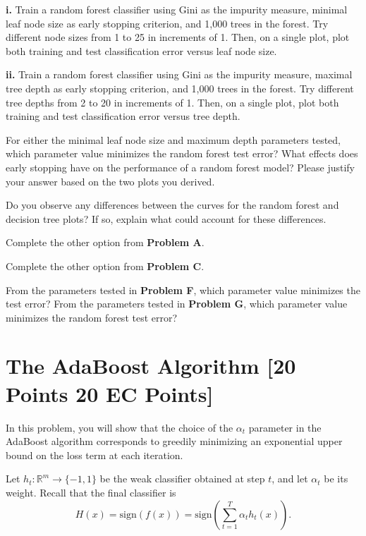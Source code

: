 \textbf{i.} Train a random forest classifier using Gini as the impurity measure, minimal leaf node size as early stopping criterion, and 1,000 trees in the forest. Try different node sizes from 1 to 25 in increments of 1. Then, on a single plot, plot both training and test classification error versus
leaf node size.

\textbf{ii.} Train a random forest classifier using Gini as the impurity measure, maximal tree depth as early stopping criterion, and 1,000 trees in the forest. Try different tree depths from 2 to 20 in increments of 1. Then, on a single plot, plot both training and test classification error versus tree depth.

\problem[3]
For either the minimal leaf node size and maximum depth parameters tested, which parameter value minimizes the random forest test error? What effects does early stopping have on the performance of a random forest model?
Please justify your answer based on the two plots you derived.


\problem[5]
Do you observe any differences between the curves for the random forest and decision tree plots? If so, explain what could account for these differences.


\problem[7 EC]
Complete the other option from \textbf{Problem A}.

\problem[2 EC]
Complete the other option from \textbf{Problem C}.

\problem[1 EC]
From the parameters tested in \textbf{Problem F}, which parameter value minimizes the test error? From the parameters tested in \textbf{Problem G}, which parameter value minimizes the random forest test error? 



\newpage
\section{The AdaBoost Algorithm [20 Points 20 EC Points]}

In this problem, you will show that the choice of the $\alpha_t$ parameter in
the AdaBoost algorithm corresponds to greedily minimizing an exponential upper
bound on the loss term at each iteration.

\problem[3 EC]
Let $h_t: \mathbb{R}^m \rightarrow \{-1,1\}$ be the weak classifier obtained at step $t$, and let $\alpha_t$ be
its weight. Recall that the final classifier is $$H(x) = \text{sign}(f(x)) = \text{sign} \left(\sum\limits_{t=1}^T \alpha_{t}h_t(x) \right).$$

